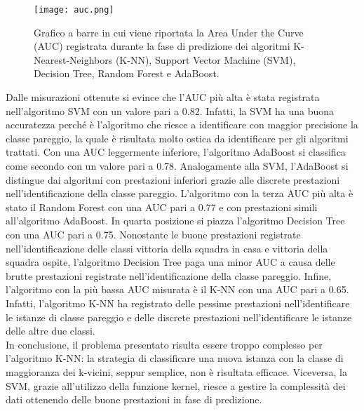 \begin{figure}[h]
	\begin{center}
		\texttt{[image: auc.png]}
		\caption{Grafico a barre in cui viene riportata la Area Under the Curve (AUC) registrata durante la fase di predizione dei algoritmi K-Nearest-Neighbors (K-NN),  Support Vector Machine (SVM), Decision Tree, Random Forest e AdaBoost.  
		} 
		\label{fig:auc}
	\end{center}
\end{figure}
Dalle misurazioni ottenute si evince che l'AUC più alta è stata registrata nell'algoritmo SVM con un valore pari a 0.82. Infatti, la SVM ha una buona accuratezza perché è l'algoritmo che riesce a identificare con maggior precisione la classe pareggio, la quale è risultata molto ostica da identificare per gli algoritmi trattati. Con una AUC leggermente inferiore, l'algoritmo AdaBoost si classifica come secondo con un valore pari a 0.78. Analogamente alla SVM, l'AdaBoost si distingue dai algoritmi con prestazioni inferiori grazie alle discrete prestazioni nell'identificazione della classe pareggio. L'algoritmo con la terza AUC più alta è stato il Random Forest con una AUC pari a 0.77 e con prestazioni simili all'algoritmo AdaBoost.
In quarta posizione si piazza l'algoritmo Decision Tree con una AUC pari a 0.75. Nonostante le buone prestazioni registrate nell'identificazione delle classi vittoria della squadra in casa e vittoria della squadra ospite, l'algoritmo Decision Tree paga una minor AUC a causa delle brutte prestazioni registrate nell'identificazione della classe pareggio. Infine, l'algoritmo con la più bassa AUC misurata è il K-NN con una AUC pari a 0.65. Infatti, l'algoritmo K-NN ha registrato delle pessime prestazioni nell'identificare le istanze di classe pareggio e delle discrete prestazioni nell'identificare le istanze delle altre due classi.\\
In conclusione, il problema presentato risulta essere troppo complesso per l'algoritmo K-NN: la strategia di classificare una nuova istanza con la classe di maggioranza dei k-vicini, seppur semplice, non è risultata efficace. Viceversa, la SVM, grazie all'utilizzo della funzione kernel, riesce a gestire la complessità dei dati ottenendo delle buone prestazioni in fase di predizione.
